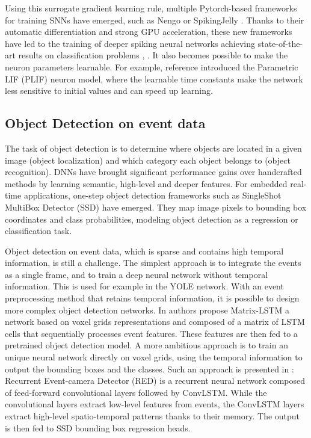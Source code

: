 \documentclass[conference]{IEEEtran}
\begin{document}
Using this surrogate gradient learning rule, multiple Pytorch-based frameworks for training SNNs have emerged, such as Nengo \cite{nengo} or SpikingJelly \cite{spikingjelly}. Thanks to their automatic differentiation and strong GPU acceleration, these new frameworks have led to the training of deeper spiking neural networks achieving state-of-the-art results on classification problems \cite{plif}, \cite{wei_neurips}. It also becomes possible to make the neuron parameters learnable. For example, reference \cite{plif} introduced the Parametric LIF (PLIF) neuron model, where the learnable time constants make the network less sensitive to initial values and can speed up learning.

\subsection{Object Detection on event data}

The task of object detection is to determine where objects are located in a given image (object localization) and which category each object belongs to (object recognition). DNNs have brought significant performance gains over handcrafted methods by learning semantic, high-level and deeper features. For embedded real-time applications, one-step object detection frameworks such as SingleShot MultiBox Detector (SSD) \cite{ssd} have emerged. They map image pixels to bounding box coordinates and class probabilities, modeling object detection as a regression or classification task.

Object detection on event data, which is sparse and contains high temporal information, is still a challenge. The simplest approach is to integrate the events as a single frame, and to train a deep neural network without temporal information. This is used for example in the YOLE network\cite{yole}. With an event preprocessing method that retains temporal information, it is possible to design more complex object detection networks. 
In \cite{matrixlstm} authors propose Matrix-LSTM a network based on voxel grids representations and composed of a matrix of LSTM cells that sequentially processes event features. These features are then fed to a pretrained object detection model. A more ambitious approach is to train an unique neural network directly on voxel grids, using the temporal information to output the bounding boxes and the classes. Such an approach is presented in \cite{1mpx}: Recurrent Event-camera Detector (RED) is a recurrent neural network composed of feed-forward convolutional layers followed by ConvLSTM. While the convolutional layers extract low-level features from events, the ConvLSTM layers extract high-level spatio-temporal patterns thanks to their memory. The output is then fed to SSD bounding box regression heads.
\end{document}
